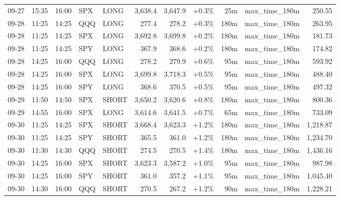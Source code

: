 \documentclass[11pt,a4paper,twoside]{article}
\begin{document}
\begin{center}
\begin{longtable}{>{\color{txtmain}}l l l l l r r r r >{\color{txtmain}}l r}
09-27 & 15:35 & 16:00 & SPX & LONG & 3,638.4 & 3,647.9 & \textcolor{wingreen}{+0.3\%} & 25m & max\_time\_180m & \textcolor{wingreen}{250.55} \\
09-28 & 11:25 & 14:25 & QQQ & LONG & 277.4 & 278.2 & \textcolor{wingreen}{+0.3\%} & 180m & max\_time\_180m & \textcolor{wingreen}{263.95} \\
09-28 & 11:25 & 14:25 & SPX & LONG & 3,692.8 & 3,699.8 & \textcolor{wingreen}{+0.2\%} & 180m & max\_time\_180m & \textcolor{wingreen}{181.73} \\
09-28 & 11:25 & 14:25 & SPY & LONG & 367.9 & 368.6 & \textcolor{wingreen}{+0.2\%} & 180m & max\_time\_180m & \textcolor{wingreen}{174.82} \\
09-28 & 14:25 & 16:00 & QQQ & LONG & 278.2 & 279.9 & \textcolor{wingreen}{+0.6\%} & 95m & max\_time\_180m & \textcolor{wingreen}{593.92} \\
09-28 & 14:25 & 16:00 & SPX & LONG & 3,699.8 & 3,718.3 & \textcolor{wingreen}{+0.5\%} & 95m & max\_time\_180m & \textcolor{wingreen}{488.40} \\
09-28 & 14:25 & 16:00 & SPY & LONG & 368.6 & 370.5 & \textcolor{wingreen}{+0.5\%} & 95m & max\_time\_180m & \textcolor{wingreen}{497.32} \\
09-29 & 11:50 & 14:50 & SPX & SHORT & 3,650.2 & 3,620.6 & \textcolor{wingreen}{+0.8\%} & 180m & max\_time\_180m & \textcolor{wingreen}{800.36} \\
09-29 & 14:55 & 16:00 & SPX & LONG & 3,614.6 & 3,641.5 & \textcolor{wingreen}{+0.7\%} & 65m & max\_time\_180m & \textcolor{wingreen}{733.09} \\
09-30 & 11:25 & 14:25 & SPX & SHORT & 3,668.4 & 3,623.3 & \textcolor{wingreen}{+1.2\%} & 180m & max\_time\_180m & \textcolor{wingreen}{1,218.87} \\
09-30 & 11:25 & 14:25 & SPY & SHORT & 365.5 & 361.0 & \textcolor{wingreen}{+1.2\%} & 180m & max\_time\_180m & \textcolor{wingreen}{1,234.70} \\
09-30 & 11:30 & 14:30 & QQQ & SHORT & 274.5 & 270.5 & \textcolor{wingreen}{+1.4\%} & 180m & max\_time\_180m & \textcolor{wingreen}{1,436.16} \\
09-30 & 14:25 & 16:00 & SPX & SHORT & 3,623.3 & 3,587.2 & \textcolor{wingreen}{+1.0\%} & 95m & max\_time\_180m & \textcolor{wingreen}{987.98} \\
09-30 & 14:25 & 16:00 & SPY & SHORT & 361.0 & 357.2 & \textcolor{wingreen}{+1.1\%} & 95m & max\_time\_180m & \textcolor{wingreen}{1,045.40} \\
09-30 & 14:30 & 16:00 & QQQ & SHORT & 270.5 & 267.2 & \textcolor{wingreen}{+1.2\%} & 90m & max\_time\_180m & \textcolor{wingreen}{1,228.21} \\

\end{longtable}
\end{center}
\end{document}

